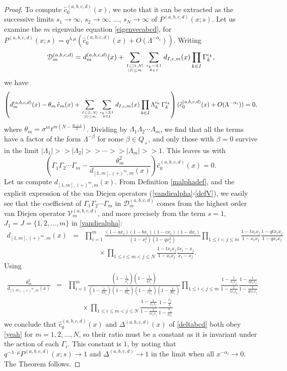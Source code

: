 \documentclass[12pt]{amsart}
\newcommand{\al}{{\alpha}}
\newcommand{\lL}{{\Lambda}}
\numberwithin{equation}{section}
\begin{document}
\begin{proof}
To compute $\hat c_0^{(a,b,c,d)}(x)$, we note that it can be extracted as the 
successive limits $s_1\to\infty$, $s_2\to \infty$, ..., $s_N\to \infty$ of $P^{(a,b,c,d)}(x;s)$. Let us examine
the $m$ eigenvalue equation \eqref{eigenvecabcd}, for $P^{(a,b,c,d)}(x;s)=q^{\lambda.\mu}(\hat c_0^{(a,b,c,d)}(x)+O(\lL^{-\al_i}))$. Writing 
$${\mathcal D}_m^{(a,b,c,d)}=d_m^{(a,b,c,d)}(x)+
\sum_{I\subset [1,N]\atop |I|\leq m} \sum_{\epsilon_k=\pm 1\atop k\in I}
d_{I,\epsilon,m}(x) \prod_{k\in I} \Gamma_k^{\epsilon_k},
$$ 
we have
$$\left(d_m^{(a,b,c,d)}(x)-\theta_m\,\hat e_m(x)+\sum_{I\subset [1,N]\atop |I|\leq m} \sum_{\epsilon_k=\pm 1\atop k\in I}
d_{I,\epsilon,m}(x) \prod_{k\in I} \lL_k^{\epsilon_k}\,\Gamma_k^{\epsilon_k}\right) (\hat c_0^{(a,b,c,d)}(x)+O(\lL^{-\al_i}))=0,$$
where $\theta_m=\sigma^m t^{m(N-\frac{m+1}{2})}$. Dividing by $\lL_1\lL_2\cdots \lL_m$, we find
that all the terms have a factor of the form $\lL^{-\beta}$ for some $\beta\in Q_+$, and only those with $\beta=0$
survive in the limit $|\lL_1|>>|\lL_2|>>\cdots >>|\lL_m|>>1$. This leaves us with 
\begin{equation}\label{yeah} \left( \Gamma_1\Gamma_2\cdots \Gamma_m -\frac{\theta_m^2}{d_{[1,m],(+)^m,m}(x)}\right)\hat c_0^{(a,b,c,d)}(x)=0.\end{equation}
Let us compute $d_{[1,m],(+)^m,m}(x)$. From Definition \ref{malphadef}, and the explicit expression of the 
van Diejen operators (\ref{vandiealpha}-\ref{defV}), we easily see that the coefficient of  $\Gamma_1\Gamma_2\cdots \Gamma_m$ in ${\mathcal D}_m^{(a,b,c,d)}$ comes from the highest order
van Diejen operator ${\mathcal V}_m^{(a,b,c,d)}$, and more precisely from the term $s=1$, $J_1=J=\{1,2,...,m\}$
in \eqref{vandiealpha}:
\begin{eqnarray*}
d_{[1,m],(+)^m,m}(x)&=&\prod_{i=1}^m \frac{(1-a x_i)(1-b x_i)(1-c x_i)(1-d x_i)}{(1-x_i^2)(1-q x_i^2)}
\prod_{1\leq i<j\leq m} \frac{1-t x_ix_j}{1-x_ix_j} \frac{1-q t x_ix_j}{1-q x_ix_j}\\
&&\qquad \times \prod_{1\leq i\leq m<j\leq N} \frac{1-t x_ix_j}{1-x_ix_j}  \frac{t x_i-x_j}{x_i-x_j}.
\end{eqnarray*}
Using
\begin{eqnarray*}
\frac{\theta_m^2}{d_{[1,m],(+)^m,m}(x)}&=&
\prod_{i=1}^m \frac{(1-\frac{1}{x_i^2})(1-\frac{1}{q x_i^2})}{(1-\frac{1}{a x_i})(1-\frac{1}{b x_i})(1-\frac{1}{c x_i})(1-\frac{1}{d x_i})}
\prod_{1\leq i<j\leq m} \frac{1-\frac{1}{x_ix_j}}{1-\frac{1}{t x_ix_j}} \frac{1-\frac{1}{q x_ix_j}}{1-\frac{1}{q t x_ix_j}}\\
&&\qquad \times \prod_{1\leq i\leq m<j\leq N} \frac{1-\frac{1}{x_ix_j}}{1-\frac{1}{t x_ix_j}}  \frac{1-\frac{x_j}{x_i}}{1-\frac{x_j}{t x_i}}
\end{eqnarray*}
we conclude that $\hat c_0^{(a,b,c,d)}(x)$ and $\Delta^{(a,b,c,d)}(x)$ of \eqref{deltabcd} both obey 
\eqref{yeah} for $m=1,2,...,N$, so their ratio must be a constant as it is invariant under 
the action of each $\Gamma_i$. This constant is $1$, by noting that 
$q^{-\lambda\cdot\mu}P^{(a,b,c,d)}(x;s)\to 1$
and $\Delta^{(a,b,c,d)}\to 1$ in the limit when all $x^{-\al_i}\to 0$.
The Theorem follows.
\end{proof}
\end{document}
